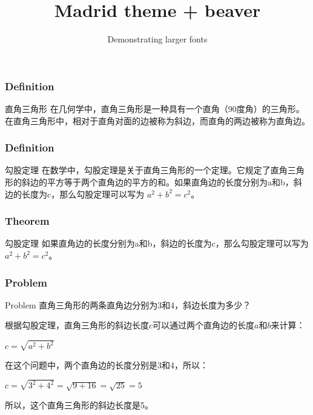 \documentclass[15pt]{beamer}
\title[] %
{Madrid theme + beaver}
\subtitle{Demonstrating larger fonts}
\author[Generated by SolveGPT] %
{}
\institute[] %
{
}
\date[] %
{}
\begin{document}
\begin{frame}
\frametitle{Definition}

\begin{block}{直角三角形}
在几何学中，直角三角形是一种具有一个直角（90度角）的三角形。在直角三角形中，相对于直角对面的边被称为斜边，而直角的两边被称为直角边。
\end{block}

\end{frame}

\begin{frame}
\frametitle{Definition}

\begin{block}{勾股定理}
在数学中，勾股定理是关于直角三角形的一个定理。它规定了直角三角形的斜边的平方等于两个直角边的平方的和。如果直角边的长度分别为a和b，斜边的长度为c，那么勾股定理可以写为 $a^2 + b^2 = c^2$。
\end{block}

\end{frame}


\begin{frame}
\frametitle{Theorem}

\begin{block}{勾股定理}
如果直角边的长度分别为a和b，斜边的长度为c，那么勾股定理可以写为 $a^2 + b^2 = c^2$。
\end{block}

\end{frame}

\begin{frame}
\frametitle{Problem}

\begin{block}{Problem}
直角三角形的两条直角边分别为3和4，斜边长度为多少？
\end{block}
根据勾股定理，直角三角形的斜边长度$c$可以通过两个直角边的长度$a$和$b$来计算：

$c = \sqrt{a^2 + b^2}$

在这个问题中，两个直角边的长度分别是3和4，所以：

$c = \sqrt{3^2 + 4^2} = \sqrt{9 + 16} = \sqrt{25} = 5$

所以，这个直角三角形的斜边长度是5。

\end{frame}
\end{document}
